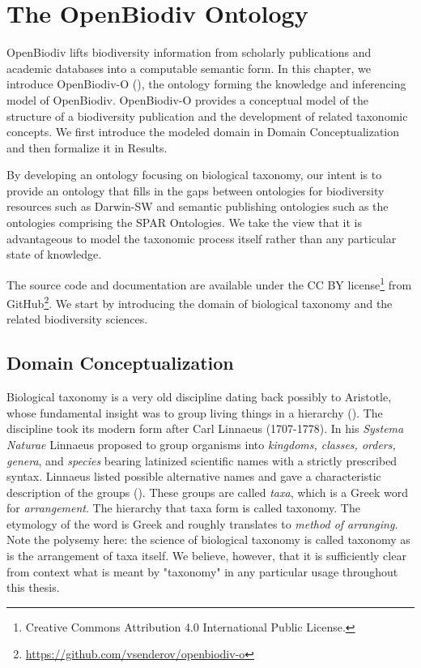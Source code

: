 \chapter{The OpenBiodiv Ontology}

\label{chapter-ontology}

OpenBiodiv lifts biodiversity information from scholarly publications and academic databases into a computable semantic form.  In this chapter, we introduce OpenBiodiv-O (\cite{senderov_openbiodiv-o:_2018}), the ontology forming the knowledge and inferencing model of OpenBiodiv. OpenBiodiv-O provides a conceptual model of the structure of a biodiversity publication and the development of related taxonomic concepts. We first introduce the modeled domain in Domain Conceptualization and then formalize it in Results. 

By developing an ontology focusing on biological taxonomy, our intent is to provide an ontology that fills in the gaps between ontologies for biodiversity resources such as Darwin-SW and semantic publishing ontologies such as the ontologies comprising the SPAR Ontologies. We take the view that it is advantageous to model the taxonomic process itself rather than any particular state of knowledge.

The source code and documentation are available under the CC BY license\footnote{Creative Commons Attribution 4.0 International Public License.} from GitHub\footnote{\href{https://github.com/vsenderov/openbiodiv-o/blob/master/LICENSE.md}{https://github.com/vsenderov/openbiodiv-o}}. We start by introducing the domain of biological taxonomy and the related biodiversity sciences.

\section{Domain Conceptualization}

Biological taxonomy is a very old discipline dating back possibly to Aristotle, whose fundamental insight was to group living things in a hierarchy (\cite{manktelow_history_2010}). The discipline took its modern form after Carl Linnaeus (1707-1778). In his \emph{Systema Naturae} Linnaeus proposed to group organisms into \emph{kingdoms, classes, orders, genera}, and \emph{species} bearing latinized scientific names with a strictly prescribed syntax. Linnaeus listed possible alternative names and gave a characteristic description of the groups (\cite{linnaeus_systema_1758}). These groups are called \emph{taxa}, which is a Greek word for \emph{arrangement}. The hierarchy that taxa form is called taxonomy. The etymology of the word is Greek and roughly translates to \emph{method of arranging}. Note the polysemy here: the science of biological taxonomy is called taxonomy as is the arrangement of taxa itself. We believe, however, that it is sufficiently clear from context what is meant by "taxonomy" in any particular usage throughout this thesis.

